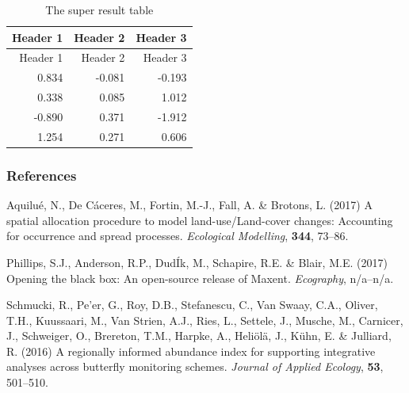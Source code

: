 \documentclass[]{article}
\begin{document}
\begin{longtable}[]{@{}rrr@{}}
\caption{The super result table}\tabularnewline
\toprule
Header 1 & Header 2 & Header 3\tabularnewline
\midrule
\endfirsthead
\toprule
Header 1 & Header 2 & Header 3\tabularnewline
\midrule
\endhead
0.834 & -0.081 & -0.193\tabularnewline
0.338 & 0.085 & 1.012\tabularnewline
-0.890 & 0.371 & -1.912\tabularnewline
1.254 & 0.271 & 0.606\tabularnewline
\bottomrule
\end{longtable}

\subsubsection*{References}\label{references}

\hypertarget{refs}{}
\hypertarget{ref-aquilueux5fspatialux5f2017}{}
Aquilué, N., De Cáceres, M., Fortin, M.-J., Fall, A. \& Brotons, L.
(2017) A spatial allocation procedure to model land-use/Land-cover
changes: Accounting for occurrence and spread processes.
\emph{Ecological Modelling}, \textbf{344}, 73--86.

\hypertarget{ref-phillipsux5fopeningux5f2017}{}
Phillips, S.J., Anderson, R.P., DudÍk, M., Schapire, R.E. \& Blair, M.E.
(2017) Opening the black box: An open-source release of Maxent.
\emph{Ecography}, n/a--n/a.

\hypertarget{ref-schmuckiux5fregionallyux5f2016}{}
Schmucki, R., Pe'er, G., Roy, D.B., Stefanescu, C., Van Swaay, C.A.,
Oliver, T.H., Kuussaari, M., Van Strien, A.J., Ries, L., Settele, J.,
Musche, M., Carnicer, J., Schweiger, O., Brereton, T.M., Harpke, A.,
Heliölä, J., Kühn, E. \& Julliard, R. (2016) A regionally informed
abundance index for supporting integrative analyses across butterfly
monitoring schemes. \emph{Journal of Applied Ecology}, \textbf{53},
501--510.
\end{document}
